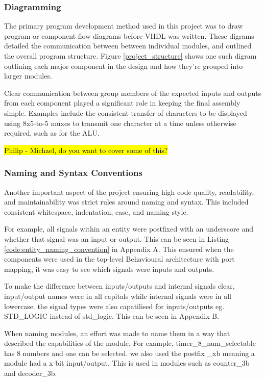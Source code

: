 \documentclass[11pt]{article}
\begin{document}
\subsubsection{Diagramming}

The primary program development method used in this project was to draw program or component flow diagrams before VHDL was written. These digrams detailed the communication between between individual modules, and outlined the overall program structure. Figure \ref{project_structure} shows one such digram outlining each major component in the design and how they're grouped into larger modules. 

Clear communication between group members of the expected inputs and outputs from each component played a significant role in keeping the final assembly simple. Examples include the consistent transfer of characters to be displayed using 8x5-to-5 muxes to transmit one character at a time unless otherwise required, such as for the ALU.

\hl{Philip - Michael, do you want to cover some of this?}

\subsubsection{Naming and Syntax Conventions}

Another important aspect of the project ensuring high code quality, readability, and maintainability was strict rules around naming and syntax. This included consistent whitespace, indentation, case, and naming style. 

For example, all signals within an entity were postfixed with an underscore and whether that signal was an input or output. This can be seen in Listing \ref{code:entity_naming_convention} in Appendix A. This ensured when the components were used in the top-level Behavioural architecture with port mapping, it was easy to see which signals were inputs and outputs.

To make the difference between inputs/outputs and internal signals clear, input/output names were in all capitals while internal signals were in all lowercase. the signal types were also capatilised for inputs/outputs eg. STD\_LOGIC instead of std\_logic. This can be seen in Appendix B.

When naming modules, an effort was made to name them in a way that described the capabilities of the module. For example,  timer_8_num_selectable has 8 numbers and one can be selected. we also used the postfix _xb meaning a module had a x bit input/output. This is used in modules such as counter_3b and decoder_3b.
\end{document}
